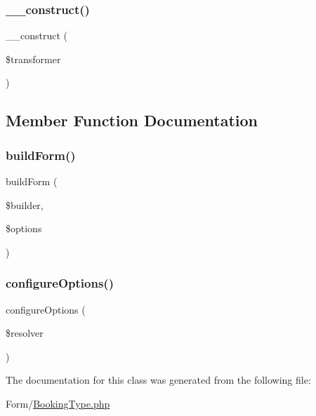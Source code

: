 \subsubsection{\texorpdfstring{\_\_construct()}{\_\_construct()}}
{\footnotesize\ttfamily \+\_\+\+\_\+construct (\begin{DoxyParamCaption}\item[{\mbox{\hyperlink{class_app_1_1_form_1_1_data_transformer_1_1_french_to_date_time_transformer}{French\+To\+Date\+Time\+Transformer}}}]{\$transformer }\end{DoxyParamCaption})}



\subsection{Member Function Documentation}
\mbox{\label{class_app_1_1_form_1_1_booking_type_a83c3745710374f9c5a1eb0686fe2dfab}} 
\subsubsection{\texorpdfstring{buildForm()}{buildForm()}}
{\footnotesize\ttfamily build\+Form (\begin{DoxyParamCaption}\item[{Form\+Builder\+Interface}]{\$builder,  }\item[{array}]{\$options }\end{DoxyParamCaption})}

\mbox{\label{class_app_1_1_form_1_1_booking_type_a8ff68a86f5090b5df973286836e46ead}} 
\subsubsection{\texorpdfstring{configureOptions()}{configureOptions()}}
{\footnotesize\ttfamily configure\+Options (\begin{DoxyParamCaption}\item[{Options\+Resolver}]{\$resolver }\end{DoxyParamCaption})}



The documentation for this class was generated from the following file\+:\begin{DoxyCompactItemize}
\item 
Form/\mbox{\hyperlink{_booking_type_8php}{Booking\+Type.\+php}}\end{DoxyCompactItemize}
